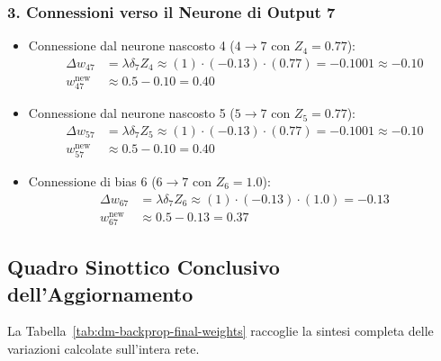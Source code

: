 \subsubsection{3. Connessioni verso il Neurone di Output 7}
\begin{itemize}
    \item Connessione dal neurone nascosto 4 ($4 \to 7$ con $Z_4 = 0.77$):
    \begin{align}
        \Delta w_{47} &= \lambda \delta_7 Z_4 \approx (1) \cdot (-0.13) \cdot (0.77) = -0.1001 \approx \mathbf{-0.10} \nonumber \\
        w_{47}^{\text{new}} &\approx 0.5 - 0.10 = \mathbf{0.40}
    \end{align}
    \item Connessione dal neurone nascosto 5 ($5 \to 7$ con $Z_5 = 0.77$):
    \begin{align}
        \Delta w_{57} &= \lambda \delta_7 Z_5 \approx (1) \cdot (-0.13) \cdot (0.77) = -0.1001 \approx \mathbf{-0.10} \nonumber \\
        w_{57}^{\text{new}} &\approx 0.5 - 0.10 = \mathbf{0.40}
    \end{align}
    \item Connessione di bias 6 ($6 \to 7$ con $Z_6 = 1.0$):
    \begin{align}
        \Delta w_{67} &= \lambda \delta_7 Z_6 \approx (1) \cdot (-0.13) \cdot (1.0) = \mathbf{-0.13} \nonumber \\
        w_{67}^{\text{new}} &\approx 0.5 - 0.13 = \mathbf{0.37}
    \end{align}
\end{itemize}

\FloatBarrier
\subsection{Quadro Sinottico Conclusivo dell'Aggiornamento}
\label{subsec:dm-summary-weights-table}

La Tabella~\ref{tab:dm-backprop-final-weights} raccoglie la sintesi completa delle variazioni calcolate sull'intera rete.

